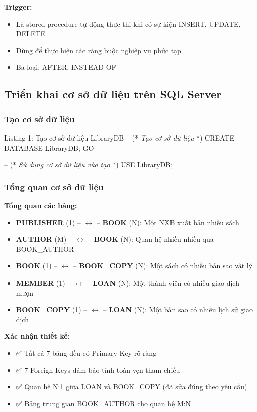 \documentclass[12pt,a4paper]{article}
\newcommand{\vncomment}[1]{\textit{\color{green!50!black}#1}}
\begin{document}
\textbf{Trigger:}
\begin{itemize}
    \item Là stored procedure tự động thực thi khi có sự kiện INSERT, UPDATE, DELETE
    \item Dùng để thực hiện các ràng buộc nghiệp vụ phức tạp
    \item Ba loại: AFTER, INSTEAD OF
\end{itemize}

\subsection{Triển khai cơ sở dữ liệu trên SQL Server}

\subsubsection{Tạo cơ sở dữ liệu}

\begin{sqlcode}{Listing 1: Tạo cơ sở dữ liệu LibraryDB}
-- (* \vncomment{Tạo cơ sở dữ liệu} *)
CREATE DATABASE LibraryDB;
GO

-- (* \vncomment{Sử dụng cơ sở dữ liệu vừa tạo} *)
USE LibraryDB;
\end{sqlcode}

\subsubsection{Tổng quan cơ sở dữ liệu}

\textbf{Tổng quan các bảng:}
\begin{itemize}
    \item \textbf{PUBLISHER} (1) -- $\leftrightarrow$ -- \textbf{BOOK} (N): Một NXB xuất bản nhiều sách
    \item \textbf{AUTHOR} (M) -- $\leftrightarrow$ -- \textbf{BOOK} (N): Quan hệ nhiều-nhiều qua BOOK\_AUTHOR
    \item \textbf{BOOK} (1) -- $\leftrightarrow$ -- \textbf{BOOK\_COPY} (N): Một sách có nhiều bản sao vật lý
    \item \textbf{MEMBER} (1) -- $\leftrightarrow$ -- \textbf{LOAN} (N): Một thành viên có nhiều giao dịch mượn
    \item \textbf{BOOK\_COPY} (1) -- $\leftrightarrow$ -- \textbf{LOAN} (N): Một bản sao có nhiều lịch sử giao dịch
\end{itemize}

\textbf{Xác nhận thiết kế:}
\begin{itemize}
    \item ✅ Tất cả 7 bảng đều có Primary Key rõ ràng
    \item ✅ 7 Foreign Keys đảm bảo tính toàn vẹn tham chiếu
    \item ✅ Quan hệ N:1 giữa LOAN và BOOK\_COPY (đã sửa đúng theo yêu cầu)
    \item ✅ Bảng trung gian BOOK\_AUTHOR cho quan hệ M:N
\end{itemize}
\end{document}
